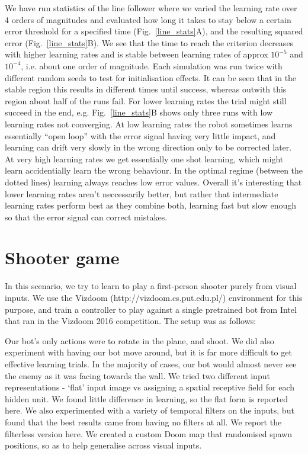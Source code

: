 \documentclass{llncs}
\begin{document}
We have run statistics of the line follower where we varied the learning
rate over 4 orders of magnitudes and evaluated how long it takes to stay
below a certain error threshold for a specified
time (Fig.~\ref{line_stats}A), and the resulting squared error (Fig.~\ref{line_stats}B).
We see that the time to reach the criterion decreases with higher learning
rates and is stable between learning rates of approx $10^{-5}$ and $10^{-4}$,
i.e. about one order of magnitude. Each simulation was run twice with different random seeds to test for initialisation effects. It can be seen that in the stable region this results
in different times until success, whereas outwith this region about
half of the runs fail. For lower learning rates the trial might still succeed 
in the end, e.g. Fig.~\ref{line_stats}B shows only three runs with low learning rates not converging. At low learning rates the robot sometimes learns essentially
``open loop'' with the error signal having very little impact, and learning
can drift very slowly in the wrong direction only to be corrected later.
At very high learning rates we get essentially one shot
learning, which might learn accidentially learn the wrong behaviour. In the optimal regime (between the dotted lines)
learning always reaches low error values. Overall it's interesting that lower
learning rates aren't neccessarily better, but rather that intermediate learning rates
perform best as they combine both, learning fast but slow enough so that the error
signal can correct mistakes.




\section{Shooter game}

In this scenario, we try to learn to play a first-person shooter purely from visual inputs. We use the Vizdoom (http://vizdoom.cs.put.edu.pl/) environment for this purpose, and train a controller to play against a single pretrained bot from Intel that ran in the Vizdoom 2016 competition. The setup was as follows:

Our bot’s only actions were to rotate in the plane, and shoot. We did also experiment with having our bot move around, but it is far more difficult to get effective learning trials. In the majority of cases, our bot would almost never see the enemy as it was facing towards the wall. We tried two different input representations - ‘flat’ input image vs assigning a spatial receptive field for each hidden unit. We found little difference in learning, so the flat form is reported here. We also experimented with a variety of temporal filters on the inputs, but found that the best results came from having no filters at all. We report the filterless version here. We created a custom Doom map that randomised spawn positions, so as to help generalise across visual inputs.
\end{document}
